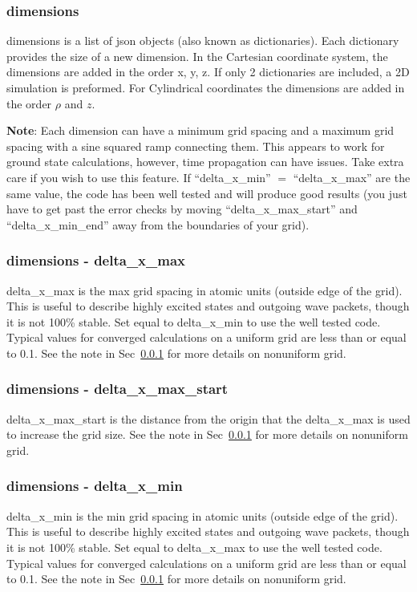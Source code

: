 \documentclass{article}
\begin{document}
\subsubsection{dimensions}
\label{ssub:dimensions}
dimensions is a list of json objects (also known as dictionaries). Each dictionary provides the size of a new dimension. In the Cartesian coordinate system, the dimensions are added in the order x, y, z. If only 2 dictionaries are included, a 2D simulation is preformed. For Cylindrical coordinates the dimensions are added in the order $\rho$ and $z$.

\textbf{Note}: Each dimension can have a minimum grid spacing and a maximum grid spacing with a sine squared ramp connecting them. This appears to work for ground state calculations, however, time propagation can have issues. Take extra care if you wish to use this feature. If ``delta\_x\_min'' $=$ ``delta\_x\_max'' are the same value, the code has been well tested and will produce good results (you just have to get past the error checks by moving ``delta\_x\_max\_start'' and ``delta\_x\_min\_end'' away from the boundaries of your grid).

\subsubsection{dimensions - delta\_x\_max}
delta\_x\_max is the max grid spacing in atomic units (outside edge of the grid). This is useful to describe highly excited states and outgoing wave packets, though it is not 100\% stable. Set equal to delta\_x\_min to use the well tested code. Typical values for converged calculations on a uniform grid are less than or equal to 0.1. See the note in Sec~\ref{ssub:dimensions} for more details on nonuniform grid.

\subsubsection{dimensions - delta\_x\_max\_start}
delta\_x\_max\_start is the distance from the origin that the delta\_x\_max is used to increase the grid size. See the note in Sec~\ref{ssub:dimensions} for more details on nonuniform grid.

\subsubsection{dimensions - delta\_x\_min}
delta\_x\_min is the min grid spacing in atomic units (outside edge of the grid). This is useful to describe highly excited states and outgoing wave packets, though it is not 100\% stable. Set equal to delta\_x\_max to use the well tested code. Typical values for converged calculations on a uniform grid are less than or equal to 0.1. See the note in Sec~\ref{ssub:dimensions} for more details on nonuniform grid.
\end{document}
